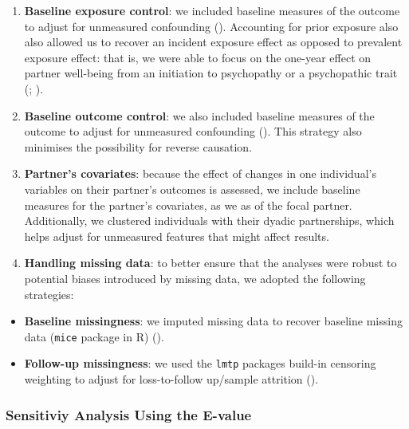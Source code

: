 \documentclass[
  singlecolumn]{article}
\providecommand{\tightlist}{%
  \setlength{\itemsep}{0pt}\setlength{\parskip}{0pt}}\usepackage{longtable,booktabs,array}
\begin{document}
\begin{enumerate}
\def\labelenumi{\arabic{enumi}.}
\setcounter{enumi}{3}
\item
  \textbf{Baseline exposure control}: we included baseline measures of
  the outcome to adjust for unmeasured confounding
  ().
  Accounting for prior exposure also also allowed us to recover an
  incident exposure effect as opposed to prevalent exposure effect: that
  is, we were able to focus on the one-year effect on partner well-being
  from an initiation to psychopathy or a psychopathic trait
  (;
  ).
\item
  \textbf{Baseline outcome control}: we also included baseline measures
  of the outcome to adjust for unmeasured confounding
  (). This
  strategy also minimises the possibility for reverse causation.
\item
  \textbf{Partner's covariates}: because the effect of changes in one
  individual's variables on their partner's outcomes is assessed, we
  include baseline measures for the partner's covariates, as we as of
  the focal partner. Additionally, we clustered individuals with their
  dyadic partnerships, which helps adjust for unmeasured features that
  might affect results.
\item
  \textbf{Handling missing data}: to better ensure that the analyses
  were robust to potential biases introduced by missing data, we adopted
  the following strategies:
\end{enumerate}

\begin{itemize}
\tightlist
\item
  \textbf{Baseline missingness}: we imputed missing data to recover
  baseline missing data (\texttt{mice} package in R)
  ().
\item
  \textbf{Follow-up missingness}: we used the \texttt{lmtp} packages
  build-in censoring weighting to adjust for loss-to-follow up/sample
  attrition ().
\end{itemize}

\subsubsection{Sensitiviy Analysis Using the
E-value}\label{sensitiviy-analysis-using-the-e-value}
\end{document}
